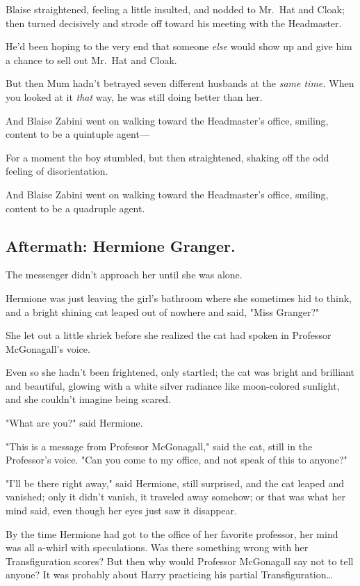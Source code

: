 Blaise straightened, feeling a little insulted, and nodded to Mr.~Hat and 
Cloak; then turned decisively and strode off toward his meeting with the 
Headmaster.

He'd been hoping to the very end that someone \emph{else} would show up and 
give him a chance to sell out Mr.~Hat and Cloak.

But then Mum hadn't betrayed seven different husbands at the \emph{same time.} 
When you looked at it \emph{that} way, he was still doing better than her.

And Blaise Zabini went on walking toward the Headmaster's office, smiling, 
content to be a quintuple agent---

For a moment the boy stumbled, but then straightened, shaking off the odd 
feeling of disorientation.

And Blaise Zabini went on walking toward the Headmaster's office, smiling, 
content to be a quadruple agent.
\sbreak
\subsection{Aftermath: Hermione Granger.}

The messenger didn't approach her until she was alone.

Hermione was just leaving the girl's bathroom where she sometimes hid to think, 
and a bright shining cat leaped out of nowhere and said, "Miss Granger?"

She let out a little shriek before she realized the cat had spoken in Professor 
McGonagall's voice.

Even so she hadn't been frightened, only startled; the cat was bright and 
brilliant and beautiful, glowing with a white silver radiance like moon-colored 
sunlight, and she couldn't imagine being scared.

"What are you?" said Hermione.

"This is a message from Professor McGonagall," said the cat, still in the 
Professor's voice. "Can you come to my office, and not speak of this to anyone?"

"I'll be there right away," said Hermione, still surprised, and the cat leaped 
and vanished; only it didn't vanish, it traveled away somehow; or that was what 
her mind said, even though her eyes just saw it disappear.

By the time Hermione had got to the office of her favorite professor, her mind 
was all a-whirl with speculations. Was there something wrong with her 
Transfiguration scores? But then why would Professor McGonagall say not to tell 
anyone? It was probably about Harry practicing his partial 
Transfiguration{\ldots}


